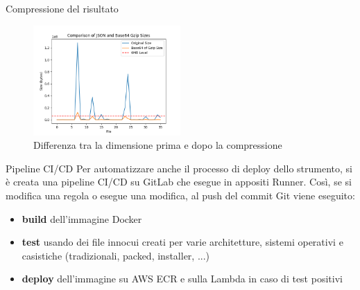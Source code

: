 \begin{frame}{Compressione del risultato}
\begin{figure}
    \centering
    \includegraphics[width=0.5\textwidth]{images/static_analysis_results_size.png}
    \caption{Differenza tra la dimensione prima e dopo la compressione}
    \label{fig:static_analysis_results_size}
\end{figure}
\end{frame}

\begin{frame}{Pipeline CI/CD}
Per automatizzare anche il processo di deploy dello strumento, si è creata una pipeline CI/CD su GitLab che esegue in appositi Runner.
\vfill
Così, se si modifica una regola o esegue una modifica, al push del commit Git viene eseguito:
\begin{itemize}
    \item \textbf{build} dell'immagine Docker
    \item \textbf{test} usando dei file innocui creati per varie architetture, sistemi operativi e casistiche (tradizionali, packed, installer, ...)
    \item \textbf{deploy} dell'immagine su AWS ECR e sulla Lambda in caso di test positivi
\end{itemize}
\end{frame}